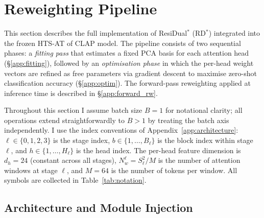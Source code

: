
\section{Reweighting Pipeline}
\label{app:residual_impl}

This section describes the full implementation of ResiDual$^*$ (RD$^*$\xspace)
integrated into the frozen HTS-AT of CLAP model.
The pipeline consists of two sequential phases: a \emph{fitting pass}
that estimates a fixed PCA basis for each attention head
(\S\ref{app:fitting}), followed by an \emph{optimisation phase} in which
the per-head weight vectors are refined as free parameters via gradient
descent to maximise zero-shot classification accuracy (\S\ref{app:optim}).
The forward-pass reweighting applied at inference time is described in
\S\ref{app:forward_rw}.

Throughout this section I assume batch size $B = 1$ for notational
clarity; all operations extend straightforwardly to $B > 1$ by treating
the batch axis independently. I use the index conventions of
Appendix~\ref{app:architecture}: $\ell \in \{0,1,2,3\}$ is the stage
index, $b \in \{1,\ldots,B_\ell\}$ is the block index within stage
$\ell$, and $h \in \{1,\ldots,H_\ell\}$ is the head index. The
per-head feature dimension is $d_h = 24$ (constant across all stages),
$N_w^\ell = S_\ell^2 / M$ is the number of attention windows at stage
$\ell$, and $M = 64$ is the number of tokens per window. All symbols are
collected in Table~\ref{tab:notation}.

\subsection{Architecture and Module Injection}
\label{app:arch_injection}

